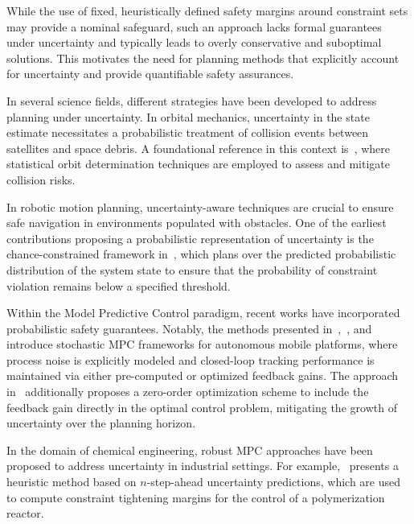 While the use of fixed, heuristically defined safety margins around constraint sets may provide a nominal safeguard, such an approach lacks formal guarantees under uncertainty and typically leads to overly conservative and suboptimal solutions. This motivates the need for planning methods that explicitly account for uncertainty and provide quantifiable safety assurances.

In several science fields, different strategies have been developed to address planning under uncertainty.
In orbital mechanics, uncertainty in the state estimate necessitates a probabilistic treatment of collision events between satellites and space debris. A foundational reference in this context is~\cite{Tapley:StatisticalOrbitDetermination:2004}, where statistical orbit determination techniques are employed to assess and mitigate collision risks.

In robotic motion planning, uncertainty-aware techniques are crucial to ensure safe navigation in environments populated with obstacles. One of the earliest contributions proposing a probabilistic representation of uncertainty is the chance-constrained framework in~\cite{Blackmore:ChanceConstrainedOptimalPath:2011}, which plans over the predicted probabilistic distribution of the system state to ensure that the probability of constraint violation remains below a specified threshold.

Within the Model Predictive Control paradigm, recent works have incorporated probabilistic safety guarantees. Notably, the methods presented in~\cite{Gao:CollisionfreeMotionPlanning:2023},~\cite{Zhang:RobustifiedTimeoptimalPointtopoint:2025}, and~\cite{Zhang:RobustifiedTimeoptimalCollisionfree:2024} introduce stochastic MPC frameworks for autonomous mobile platforms, where process noise is explicitly modeled and closed-loop tracking performance is maintained via either pre-computed or optimized feedback gains. The approach in~\cite{Gao:CollisionfreeMotionPlanning:2023} additionally proposes a zero-order optimization scheme to include the feedback gain directly in the optimal control problem, mitigating the growth of uncertainty over the planning horizon.

In the domain of chemical engineering, robust MPC approaches have been proposed to address uncertainty in industrial settings. For example,~\cite{Krog:SimpleFastRobust:2024} presents a heuristic method based on $n$-step-ahead uncertainty predictions, which are used to compute constraint tightening margins for the control of a polymerization reactor.


